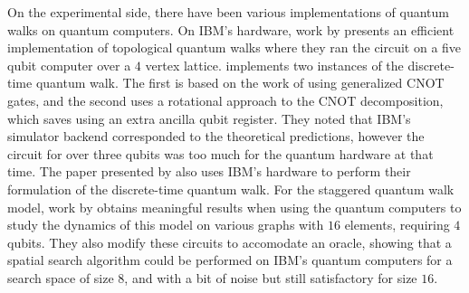 \documentclass[../../dissertation.tex]{subfiles}
\begin{document}
On the experimental side, there have been various implementations of
quantum walks on quantum computers. On IBM's hardware, work by \cite{balu2017}
presents an efficient implementation of topological quantum walks where they
ran the circuit on a five qubit computer over a $4$ vertex lattice.
\cite{Georgopoulos2019} implements two instances of the discrete-time quantum
walk. The first is based on the work of \cite{douglaswang07} using generalized
CNOT gates, and the second uses a rotational approach to the CNOT
decomposition, which saves using an extra ancilla qubit register. They noted
that IBM's simulator backend corresponded to the theoretical predictions,
however the circuit for over three qubits was too much for the quantum hardware
at that time. The paper presented by \cite{shakeel2020} also uses IBM's
hardware to perform their formulation of the discrete-time quantum walk. For
the staggered quantum walk model, work by \cite{acasiete2020} obtains
meaningful results when using the quantum computers to study the dynamics of
this model on various graphs with $16$ elements, requiring $4$ qubits. They
also modify these circuits to accomodate an oracle, showing that a spatial
search algorithm could be performed on IBM's quantum computers for a search
space of size $8$, and with a bit of noise but still satisfactory for size
$16$.
\end{document}
